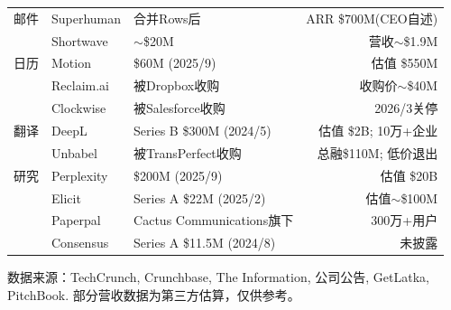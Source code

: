 \begin{keybox}
\begin{tabularx}{\textwidth}{l l X r}
\midrule
邮件     & Superhuman     & 合并Rows后                   & ARR \$700M(CEO自述) \\
         & Shortwave      & $\sim$\$20M                  & 营收$\sim$\$1.9M \\
\midrule
日历     & Motion         & \$60M (2025/9)               & 估值 \$550M \\
         & Reclaim.ai     & 被Dropbox收购                & 收购价$\sim$\$40M \\
         & Clockwise      & 被Salesforce收购             & 2026/3关停 \\
\midrule
翻译     & DeepL          & Series B \$300M (2024/5)     & 估值 \$2B; 10万+企业 \\
         & Unbabel        & 被TransPerfect收购           & 总融\$110M; 低价退出 \\
\midrule
研究     & Perplexity     & \$200M (2025/9)              & 估值 \$20B \\
         & Elicit         & Series A \$22M (2025/2)      & 估值$\sim$\$100M \\
         & Paperpal       & Cactus Communications旗下    & 300万+用户 \\
         & Consensus      & Series A \$11.5M (2024/8)    & 未披露 \\
\bottomrule
\end{tabularx}

\medskip
\noindent 数据来源：TechCrunch, Crunchbase, The Information, 公司公告,
GetLatka, PitchBook. 部分营收数据为第三方估算，仅供参考。
\end{keybox}

